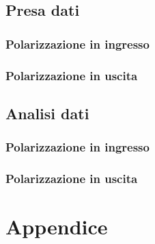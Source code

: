 \documentclass[a4paper]{article}
\begin{document}
\subsection{Presa dati}

\subsubsection{Polarizzazione in ingresso}

\subsubsection{Polarizzazione in uscita}

\subsection{Analisi dati}

\subsubsection{Polarizzazione in ingresso}

\subsubsection{Polarizzazione in uscita}


\newpage
\section*{Appendice}
	
\end{document}
